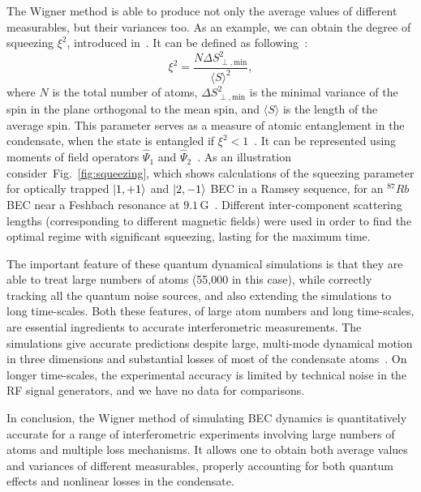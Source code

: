 \documentclass[aps,prl,twocolumn,showpacs,amsmath,amssymb,superscriptaddress,flushbottom,noraggedfooter]{revtex4-1}
\newcommand{\figref}[1]{Fig.~\ref{#1}}
\newcommand{\ket}[1]{\mbox{\ensuremath{\vert #1 \rangle}}}
\begin{document}
The Wigner method is able to produce not only the average values of different measurables,
but their variances too.
As an example, we can obtain the degree of squeezing $\xi^2$, introduced in~\cite{Wineland1994,Sorensen2001}.
It can be defined as following~\cite{Li2009}:
\begin{equation}
\label{eqn:squeezing}
	\xi^2 = \frac{N \Delta S^2_{\perp, \mathrm{min}}}{\langle S \rangle^2},
\end{equation}
where $N$ is the total number of atoms,
$\Delta S^2_{\perp, \mathrm{min}}$ is the minimal variance of the spin in the plane orthogonal to the mean spin,
and $\langle S \rangle$ is the length of the average spin.
This parameter serves as a measure of atomic entanglement in the condensate,
when the state is entangled if $\xi^2 < 1$~\cite{Sorensen2001}.
It can be represented using moments of field operators $\widehat{\Psi}_1$
and $\widehat{\Psi}_2$~\cite{Li2009}.
As an illustration consider~\figref{fig:squeezing}, which shows calculations of the squeezing parameter
for optically trapped $\ket{1,+1}$ and $\ket{2,-1}$ BEC in a Ramsey sequence, for an $^{87}Rb$ BEC near a Feshbach resonance at $9.1\,\mathrm{G}$~\cite{Kaufman2009}.
Different inter-component scattering lengths (corresponding to different magnetic fields) were used in order to find the optimal regime
with significant squeezing, lasting for the maximum time.

The important feature of these quantum dynamical simulations
is that they are able to treat large numbers of atoms (55,000 in this case),
while correctly tracking all the quantum noise sources, and also extending the simulations to long time-scales.
Both these features, of large atom numbers and long time-scales,
are essential ingredients to accurate interferometric measurements.
The simulations give accurate predictions despite large, multi-mode dynamical motion in three dimensions
and substantial losses of most of the condensate atoms~\cite{Egorov2010}.
On longer time-scales, the experimental accuracy is limited by technical noise in the RF signal generators,
and we have no data for comparisons.

In conclusion, the Wigner method of simulating BEC dynamics
is quantitatively accurate  for a range of interferometric experiments
involving large numbers of atoms and multiple loss mechanisms.
It allows one to obtain both average values and variances of different measurables,
properly accounting for both quantum effects and nonlinear losses in the condensate.


\end{document}
